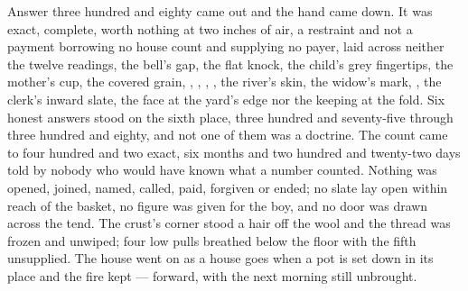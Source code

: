 Answer three hundred and eighty came out and the hand came down. It was exact, complete, worth nothing at two inches of air, a restraint and not a payment borrowing no house count and supplying no payer, laid across neither the twelve readings, the bell's gap, the flat knock, the child's grey fingertips, the mother's cup, the covered grain, , , , , the river's skin, the widow's mark, , the clerk's inward slate, the face at the yard's edge nor the keeping at the fold. Six honest answers stood on the sixth place, three hundred and seventy-five through three hundred and eighty, and not one of them was a doctrine. The count came to four hundred and two exact, six months and two hundred and twenty-two days told by nobody who would have known what a number counted. Nothing was opened, joined, named, called, paid, forgiven or ended; no slate lay open within reach of the basket, no figure was given for the boy, and no door was drawn across the tend. The crust's corner stood a hair off the wool and the thread was frozen and unwiped; four low pulls breathed below the floor with the fifth unsupplied. The house went on as a house goes when a pot is set down in its place and the fire kept --- forward, with the next morning still unbrought.
